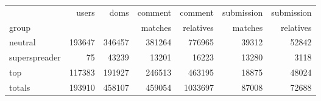 \begin{tabular}{lrrrrrr}
\toprule
{} & users & doms & comment & comment & submission &  submission \\
group         &  &  & matches & relatives & matches & relatives \\
\midrule
neutral       &  193647 &  346457 &           381264 &             776965 &               39312 &                 52842 \\
superspreader &      75 &   43239 &            13201 &              16223 &               13280 &                  3118 \\
top           &  117383 &  191927 &           246513 &             463195 &               18875 &                 48024 \\
totals        &  193910 &  458107 &           459054 &            1033697 &               87008 &                 72688 \\
\bottomrule
\end{tabular}
